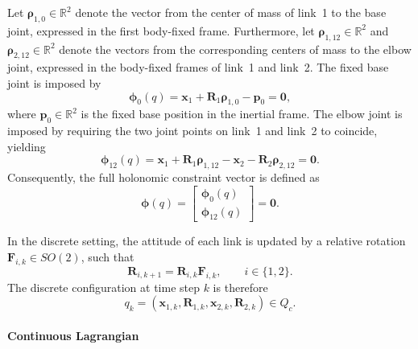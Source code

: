 Let \(\bm{\rho}_{1,0}\in\mathbb{R}^2\) denote the vector from the center of mass of
link~1 to the base joint, expressed in the first body-fixed frame. Furthermore, let
\(\bm{\rho}_{1,12}\in\mathbb{R}^2\) and \(\bm{\rho}_{2,12}\in\mathbb{R}^2\) denote the
vectors from the corresponding centers of mass to the elbow joint, expressed in
the body-fixed frames of link~1 and link~2. The fixed base joint is imposed by
\begin{equation}
    \bm{\phi}_{0}(q)
    =
    \bm{x}_1
    +
    \bm{R}_1\bm{\rho}_{1,0}
    -
    \bm{p}_0
    =
    \bm{0},
    \label{eq:acrobot_base_constraint}
\end{equation}
where \(\bm{p}_0\in\mathbb{R}^2\) is the fixed base position in the inertial frame.
The elbow joint is imposed by requiring the two joint points on link~1 and link~2
to coincide, yielding
\begin{equation}
    \bm{\phi}_{12}(q)
    =
    \bm{x}_1
    +
    \bm{R}_1\bm{\rho}_{1,12}
    -
    \bm{x}_2
    -
    \bm{R}_2\bm{\rho}_{2,12}
    =
    \bm{0}.
    \label{eq:acrobot_elbow_constraint}
\end{equation}
Consequently, the full holonomic constraint vector is defined as
\begin{equation}
    \bm{\phi}(q)
    =
    \begin{bmatrix}
        \bm{\phi}_{0}(q) \\
        \bm{\phi}_{12}(q)
    \end{bmatrix}
    =
    \bm{0}.
    \label{eq:acrobot_constraints}
\end{equation}

In the discrete setting, the attitude of each link is updated by a relative rotation
\(\bm{F}_{i,k}\in SO(2)\), such that
\begin{equation}
    \bm{R}_{i,k+1}
    =
    \bm{R}_{i,k}\bm{F}_{i,k},
    \qquad i\in\{1,2\}.
    \label{eq:acrobot_rotation_update}
\end{equation}
The discrete configuration at time step \(k\) is therefore
\begin{equation}
    q_k
    =
    \left(
    \bm{x}_{1,k},\bm{R}_{1,k},
    \bm{x}_{2,k},\bm{R}_{2,k}
    \right)
    \in Q_c .
    \label{eq:acrobot_discrete_configuration}
\end{equation}

\paragraph{Continuous Lagrangian}

